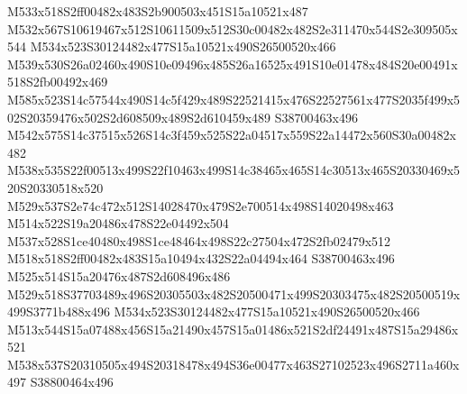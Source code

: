 \documentclass{article}
\begin{document}
\begin{multicols}{2}


M533x518S2ff00482x483S2b900503x451S15a10521x487 M532x567S10619467x512S10611509x512S30c00482x482S2e311470x544S2e309505x544 M534x523S30124482x477S15a10521x490S26500520x466 M539x530S26a02460x490S10e09496x485S26a16525x491S10e01478x484S20e00491x518S2fb00492x469 M585x523S14c57544x490S14c5f429x489S22521415x476S22527561x477S2035f499x502S20359476x502S2d608509x489S2d610459x489 S38700463x496 M542x575S14c37515x526S14c3f459x525S22a04517x559S22a14472x560S30a00482x482 M538x535S22f00513x499S22f10463x499S14c38465x465S14c30513x465S20330469x520S20330518x520 M529x537S2e74c472x512S14028470x479S2e700514x498S14020498x463 M514x522S19a20486x478S22e04492x504 M537x528S1ce40480x498S1ce48464x498S22c27504x472S2fb02479x512 M518x518S2ff00482x483S15a10494x432S22a04494x464 S38700463x496 M525x514S15a20476x487S2d608496x486 M529x518S37703489x496S20305503x482S20500471x499S20303475x482S20500519x499S3771b488x496 M534x523S30124482x477S15a10521x490S26500520x466 M513x544S15a07488x456S15a21490x457S15a01486x521S2df24491x487S15a29486x521 M538x537S20310505x494S20318478x494S36e00477x463S27102523x496S2711a460x497 S38800464x496










\end{multicols}
\end{document}
